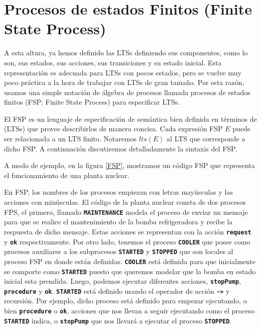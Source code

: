 \section{Procesos de estados Finitos (Finite State Process)}

A esta altura, ya hemos definido las LTSs definiendo sus componentes, como lo son, sus estados, sus acciones, sus
transiciones y su estado inicial. Esta representación es adecuada para LTSs con pocos estados, pero se vuelve muy poco
práctica a la hora de trabajar con LTSs de gran tamaño. Por esta razón, usamos una simple notación de álgebra de
procesos llamada procesos de estados finitos (FSP: Finite State Process) para especificar LTSs.
\cite{644733,Magee:2000:CSM:332036}

El FSP es un lenguaje de especificación de semántica bien definida en términos de (LTSs) que provee describirlos de
manera concisa. Cada expresión FSP $E$ puede ser relacionada a un LTS finito. Notaremos $lts(E)$ al LTS que corresponde a dicho FSP.
A continuación discutiremos detalladamente la sintaxis del FSP.

A modo de ejemplo, en la figura \ref{FSP}, mostramos un código FSP que representa el funcionamiento de una planta nuclear.

En FSP, los nombres de los procesos empiezan con letras mayúsculas y las acciones con minúsculas. El código de la planta
nuclear consta de dos procesos FPS, el primero, llamado \texttt{\textbf{MAINTENANCE}} modela el proceso de enviar un
mensaje para que se realice el mantenimiento de la bomba refrigeradora y recibe la respuesta de dicho mensaje. Estas
acciones se representan con la acción \texttt{\textbf{request}} y \texttt{\textbf{ok}} respectivamente. Por otro lado,
tenemos el proceso \texttt{\textbf{COOLER}} que posee como procesos auxiliares a los subprocesos \texttt{\textbf{STARTED}}
y \texttt{\textbf{STOPPED}} que son locales al proceso FSP en donde están definidas. \texttt{\textbf{COOLER}} está
definida para que inicialmente se comporte como \texttt{\textbf{STARTED}} puesto que queremos modelar que la bomba en
estado inicial esta prendida. Luego, podemos ejecutar diferentes acciones, \texttt{\textbf{stopPump}},
\texttt{\textbf{procedure}} y \texttt{\textbf{ok}}. \texttt{\textbf{STARTED}} está definido usando el operador de acción 
\texttt{\textbf{->}} y recursión. Por ejemplo, dicho proceso está definido para empezar ejecutando, o bien \texttt{\textbf{procedure}}
o \texttt{\textbf{ok}}, acciones que nos llevan a seguir ejecutando como el proceso \texttt{\textbf{STARTED}} indica, o
\texttt{\textbf{stopPump}} que nos llevará a ejecutar el proceso \texttt{\textbf{STOPPED}}.

